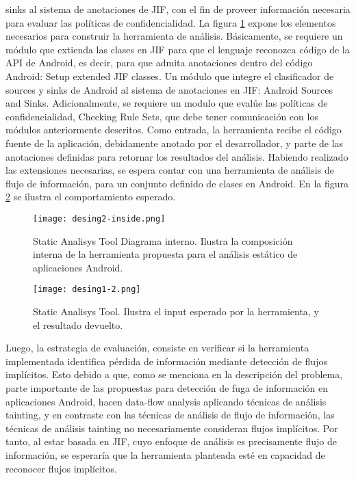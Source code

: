 sinks al sistema de anotaciones de JIF, con el fin de proveer información
necesaria para evaluar las políticas de confidencialidad.\newline 
La figura \ref{fig:desing1-in} expone los elementos necesarios para construir la
herramienta de análisis. Básicamente, se requiere un módulo que extienda las
clases en JIF para que el lenguaje reconozca código de la API de Android, es
decir, para que admita anotaciones dentro del código Android: Setup extended JIF
classes. Un módulo que integre el clasificador de sources y sinks de Android al
sistema de anotaciones en JIF:  Android Sources and Sinks. Adicionalmente, se
requiere un modulo que evalúe las políticas de confidencialidad, Checking
Rule Sets, que debe tener comunicación con los módulos anteriormente descritos.
Como entrada, la herramienta recibe el código fuente de la aplicación,
debidamente anotado por el desarrollador, y parte de las anotaciones definidas
para retornar los resultados del análisis.\newline
Habiendo realizado las extensiones necesarias, se espera contar con una
herramienta de análisis de flujo de información, para un conjunto definido de
clases en Android. En la figura \ref{fig:desing1} se ilustra el comportamiento
esperado.\newline

\begin{figure}[t!]
	\begin{center}
	\texttt{[image: desing2-inside.png]}
	\end{center}
	\caption{Static Analisys Tool Diagrama interno. Ilustra la composición interna
	de la herramienta propuesta para el análisis estático de aplicaciones Android.}
	\label{fig:desing1-in}
\end{figure}

\begin{figure}[t!]
	\begin{center}
	\texttt{[image: desing1-2.png]}
	\end{center}
	\caption{Static Analisys Tool. Ilustra el input esperado por la herramienta, y
	el resultado devuelto.}
	\label{fig:desing1}
\end{figure} 

Luego, la estrategia de evaluación, consiste en verificar si la herramienta
implementada identifica pérdida de información mediante detección de flujos
implícitos. Esto debido a que, como se menciona en la descripción del problema,
parte importante de las propuestas para detección de fuga de información en
aplicaciones Android, hacen data-flow analysis aplicando técnicas de análisis
tainting, y en contraste con las técnicas de análisis de flujo de información,
las técnicas de análisis tainting no necesariamente consideran flujos
implícitos. Por tanto, al estar basada en JIF, cuyo enfoque de análisis es
precisamente flujo de información, se esperaría que la herramienta planteada
esté en capacidad de reconocer flujos implícitos.

